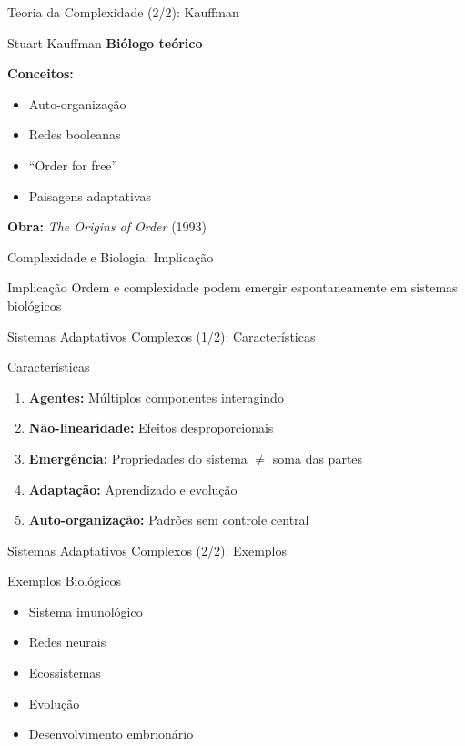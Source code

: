 \begin{frame}{Teoria da Complexidade (2/2): Kauffman}
\begin{block}{Stuart Kauffman}
\textbf{Biólogo teórico}

\vspace{0.2cm}

\textbf{Conceitos:}
\begin{itemize}
    \item Auto-organização
    \item Redes booleanas
    \item ``Order for free''
    \item Paisagens adaptativas
\end{itemize}

\vspace{0.2cm}
\textbf{Obra:} \textit{The Origins of Order} (1993)
\end{block}
\end{frame}

\begin{frame}{Complexidade e Biologia: Implicação}
\begin{exampleblock}{Implicação}
Ordem e complexidade podem emergir espontaneamente em sistemas biológicos
\end{exampleblock}
\end{frame}

\begin{frame}{Sistemas Adaptativos Complexos (1/2): Características}
\begin{block}{Características}
\begin{enumerate}
    \item \textbf{Agentes:} Múltiplos componentes interagindo
    \item \textbf{Não-linearidade:} Efeitos desproporcionais
    \item \textbf{Emergência:} Propriedades do sistema $\neq$ soma das partes
    \item \textbf{Adaptação:} Aprendizado e evolução
    \item \textbf{Auto-organização:} Padrões sem controle central
\end{enumerate}
\end{block}
\end{frame}

\begin{frame}{Sistemas Adaptativos Complexos (2/2): Exemplos}
\begin{exampleblock}{Exemplos Biológicos}
\begin{itemize}
    \item Sistema imunológico
    \item Redes neurais
    \item Ecossistemas
    \item Evolução
    \item Desenvolvimento embrionário
\end{itemize}
\end{exampleblock}
\end{frame}

